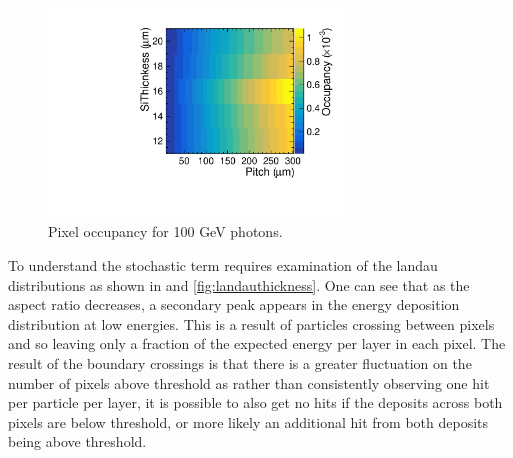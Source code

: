 \begin{figure}
  \centering
  \includegraphics[width=0.7\textwidth,keepaspectratio]{DECALStudies/fig/Occupancy_100GeV.pdf}
  \caption{Pixel occupancy for 100 GeV photons.}
  \label{fig:occupancy}
\end{figure}


To understand the stochastic term requires examination of the landau distributions as shown in  and \ref{fig:landauthickness}. One can see that as the aspect ratio decreases, a secondary peak appears in the energy deposition distribution at low energies. This is a result of particles crossing between pixels and so leaving only a fraction of the expected energy per layer in each pixel. The result of the boundary crossings is that there is a greater fluctuation on the number of pixels above threshold as rather than consistently observing one hit per particle per layer, it is possible to also get no hits if the deposits across both pixels are below threshold, or more likely an additional hit from both deposits being above threshold. 

